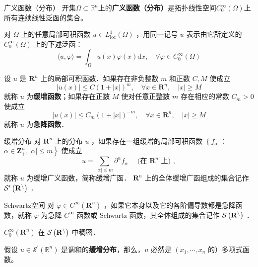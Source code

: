 \documentclass{mynote}
\begin{document}
\newpage %
\setcounter{page}{1} %

\begin{definition}{广义函数（分布）}
    开集$\Omega\subset \mathbb{R}^n$上的\textbf{广义函数（分布）}是拓扑线性空间$C^\infty_0(\Omega)$上所有连续线性泛函的集合。
\end{definition}

对 $\Omega$ 上的任意局部可积函数 $u \in L_{\mathrm{loc}}^1(\Omega)$ ，用同一记号 $u$ 表示由它所定义的 $C_0^{\infty}(\Omega)$ 上的下述泛函：
\[
    \langle u, \varphi\rangle=\int_{\Omega} u(x) \varphi(x) \mathrm{d} x, \quad \forall \varphi \in C_0^{\infty}(\Omega)
\]

设 $u$ 是 $\mathbf{R}^n$ 上的局部可积函数．如果存在非负整数 $m$ 和正数 $C, M$ 使成立
\[
    |u(x)| \leqslant C(1+|x|)^m, \quad \forall x \in \mathbf{R}^n, \quad|x| \geqslant M
\]
就称 $u$ 为\textbf{缓增函数}；如果存在正数 $M$ 使对任意正整数 $m$ 存在相应的常数 $C_m>0$使成立
\[
    |u(x)| \leqslant C_m(1+|x|)^{-m}, \quad \forall x \in \mathbf{R}^n, \quad|x| \geqslant M
\]
就称 $u$ 为\textbf{急降函数}．

\begin{definition}{缓增分布}
    对 $\mathbf{R}^n$ 上的分布 $u$ ，如果存在一组缓增的局部可积函数 $\left\{f_\alpha\right.$ ： $\left.\alpha \in \mathbf{Z}_{+}^n,|\alpha| \leqslant m\right\}$ 使成立
$$
u=\sum_{|\alpha| \leqslant m} \partial^\alpha f_\alpha \quad \text { (在 } \mathbf{R}^n \text { 上) },
$$
    就称 $u$ 为缓增广义函数，简称缓增广函． $\mathbf{R}^n$ 上的全体缓增广函组成的集合记作 $\cal{S}^{\prime}\left(\mathbf{R}^n\right)$ ．
\end{definition}
\begin{definition}{Schwartz空间}
    对 $\varphi \in C^{\infty}\left(\mathbf{R}^n\right)$ ，如果它本身以及它的各阶偏导数都是急降函数，就称 $\varphi$ 为急降 $C^{\infty}$ 函数或 Schwartz 函数，其全体组成的集合记作 $\cal{S}\left(\mathbf{R}^n\right)$ ．
\end{definition}
\begin{lemma}
    $C_0^{\infty}\left(\mathbf{R}^n\right)$ 在 $\cal{S}\left(\mathbf{R}^n\right)$ 中稠密．
\end{lemma}

\begin{proposition}
    假设 $u \in \mathcal{S}^{\prime}\left(\mathbb{R}^n\right)$ 是调和的\textbf{缓增分布}，那么，$u$ 必然是 $\left(x_1, \cdots, x_n\right.$ 的）多项式函数。
\end{proposition}
\end{document}
